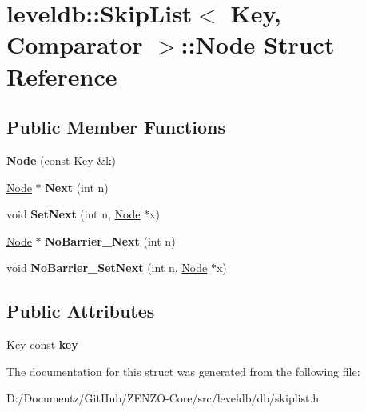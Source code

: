 \hypertarget{structleveldb_1_1_skip_list_1_1_node}{}\section{leveldb\+::Skip\+List$<$ Key, Comparator $>$\+::Node Struct Reference}
\label{structleveldb_1_1_skip_list_1_1_node}
\subsection*{Public Member Functions}
\begin{DoxyCompactItemize}
\item 
\mbox{\label{structleveldb_1_1_skip_list_1_1_node_a7dec52445f4f05892239a77407d109b0}} 
{\bfseries Node} (const Key \&k)
\item 
\mbox{\label{structleveldb_1_1_skip_list_1_1_node_aca7f18fc57f6c8e8a8dfe176eedbde74}} 
\mbox{\hyperlink{structleveldb_1_1_skip_list_1_1_node}{Node}} $\ast$ {\bfseries Next} (int n)
\item 
\mbox{\label{structleveldb_1_1_skip_list_1_1_node_a46c7cc10db3d77c85df7e411b720a8f4}} 
void {\bfseries Set\+Next} (int n, \mbox{\hyperlink{structleveldb_1_1_skip_list_1_1_node}{Node}} $\ast$x)
\item 
\mbox{\label{structleveldb_1_1_skip_list_1_1_node_a96b7213d1fd9ef893f3a7baecc5c4801}} 
\mbox{\hyperlink{structleveldb_1_1_skip_list_1_1_node}{Node}} $\ast$ {\bfseries No\+Barrier\+\_\+\+Next} (int n)
\item 
\mbox{\label{structleveldb_1_1_skip_list_1_1_node_af93b362f5e38fcf645820e02377cca64}} 
void {\bfseries No\+Barrier\+\_\+\+Set\+Next} (int n, \mbox{\hyperlink{structleveldb_1_1_skip_list_1_1_node}{Node}} $\ast$x)
\end{DoxyCompactItemize}
\subsection*{Public Attributes}
\begin{DoxyCompactItemize}
\item 
\mbox{\label{structleveldb_1_1_skip_list_1_1_node_a654f196e057edd294e4dbcbb6dabb844}} 
Key const {\bfseries key}
\end{DoxyCompactItemize}


The documentation for this struct was generated from the following file\+:\begin{DoxyCompactItemize}
\item 
D\+:/\+Documentz/\+Git\+Hub/\+Z\+E\+N\+Z\+O-\/\+Core/src/leveldb/db/skiplist.\+h\end{DoxyCompactItemize}
